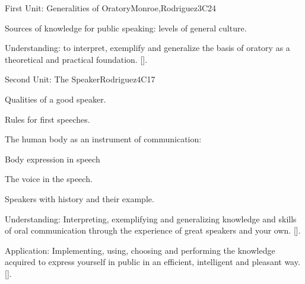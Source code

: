 \begin{syllabus}
\begin{unit}{}{First Unit: Generalities of Oratory}{Monroe,Rodriguez}{3}{C24}
\begin{topics}
	\item Sources of knowledge for public speaking: levels of general culture.
\end{topics}
\begin{learningoutcomes}
	\item Understanding: to interpret, exemplify and generalize the basis of oratory as a theoretical and practical foundation. [\Usage].
\end{learningoutcomes}
\end{unit}

\begin{unit}{}{Second Unit: The Speaker}{Rodriguez}{4}{C17}
\begin{topics}
	\item Qualities of a good speaker.
	\item Rules for first speeches.
	\item The human body as an instrument of communication:
		\begin{subtopics}
			\item Body expression in speech
			\item The voice in the speech.
	   	\end{subtopics}
	\item Speakers with history and their example.
\end{topics}
\begin{learningoutcomes}
	\item Understanding: Interpreting, exemplifying and generalizing knowledge and skills of oral communication through the experience of great speakers and your own. [\Usage].
	\item Application: Implementing, using, choosing and performing the knowledge acquired to express yourself in public in an efficient, intelligent and pleasant way. [\Usage].
\end{learningoutcomes}
\end{unit}


\end{syllabus}
